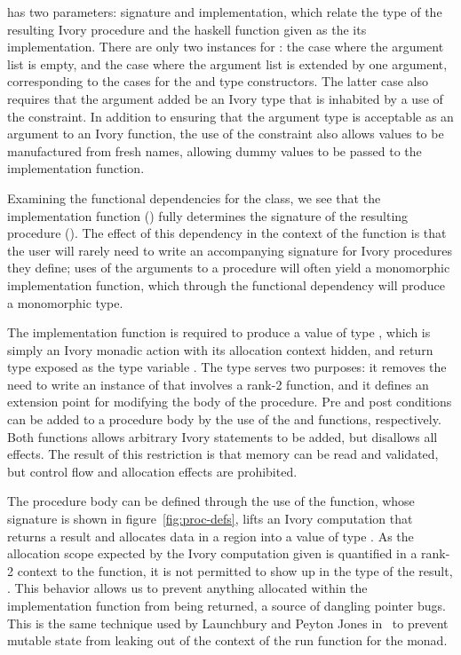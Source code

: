  has two parameters: signature and implementation, which relate
the  type of the resulting Ivory procedure and the haskell function
given as the its implementation.  There are only two instances for
: the case where the argument list is empty, and the case where
the argument list is extended by one argument, corresponding to the cases for
the  and  type constructors.  The latter case also requires
that the argument added be an Ivory type that is inhabited by a use of the
 constraint.  In addition to ensuring that the argument type is
acceptable as an argument to an Ivory function, the use of the 
constraint also allows values to be manufactured from fresh names, allowing
dummy values to be passed to the implementation function.

Examining the functional dependencies for the  class, we see
that the implementation function () fully determines the signature of
the resulting procedure ().  The effect of this dependency in the
context of the  function is that the user will rarely need to write an
accompanying  signature for Ivory procedures they define; uses of the
arguments to a procedure will often yield a monomorphic implementation function,
which through the functional dependency will produce a monomorphic 
type.

The implementation function is required to produce a value of type ,
which is simply an Ivory monadic action with its allocation context hidden, and
return type exposed as the type variable .  The  type serves two
purposes: it removes the need to write an instance of  that
involves a rank-2 function, and it defines an extension point for modifying the
body of the procedure.  Pre and post conditions can be added to a procedure body
by the use of the  and  functions, respectively.  Both
functions allows arbitrary Ivory statements to be added, but disallows all
effects.  The result of this restriction is that memory can be read and
validated, but control flow and allocation effects are prohibited.

The procedure body can be defined through the use of the  function,
whose signature is shown in figure~\ref{fig:proc-defs}, lifts an Ivory
computation that returns a result  and allocates data in a region 
into a value of type .  As the allocation scope expected by the Ivory
computation given is quantified in a rank-2 context to the  function,
it is not permitted to show up in the type of the result, .  This behavior
allows us to prevent anything allocated within the implementation function from
being returned, a source of dangling pointer bugs.  This is the same technique
used by Launchbury and Peyton Jones in~\cite{stmonad} to prevent mutable state
from leaking out of the context of the run function for the  monad.

